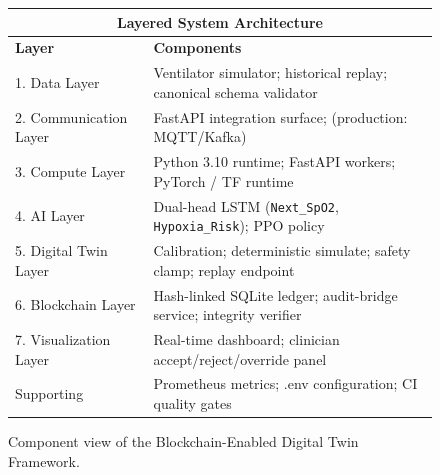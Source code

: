 \documentclass[12pt,a4paper,oneside]{report}
\begin{document}
\begin{figure}[h]
\centering
\begin{tabular}{|p{1.4in}|p{4in}|}
\hline
\multicolumn{2}{|c|}{\textbf{Layered System Architecture}}\\
\hline
\textbf{Layer} & \textbf{Components}\\
\hline
1. Data Layer & Ventilator simulator; historical replay; canonical schema validator\\
\hline
2. Communication Layer & FastAPI integration surface; (production: MQTT/Kafka)\\
\hline
3. Compute Layer & Python 3.10 runtime; FastAPI workers; PyTorch / TF runtime\\
\hline
4. AI Layer & Dual-head LSTM (\texttt{Next\_SpO2}, \texttt{Hypoxia\_Risk}); PPO policy\\
\hline
5. Digital Twin Layer & Calibration; deterministic simulate; safety clamp; replay endpoint\\
\hline
6. Blockchain Layer & Hash-linked SQLite ledger; audit-bridge service; integrity verifier\\
\hline
7. Visualization Layer & Real-time dashboard; clinician accept/reject/override panel\\
\hline
Supporting & Prometheus metrics; .env configuration; CI quality gates\\
\hline
\end{tabular}
\caption{Component view of the Blockchain-Enabled Digital Twin Framework.}
\label{fig:components}
\end{figure}
\end{document}
